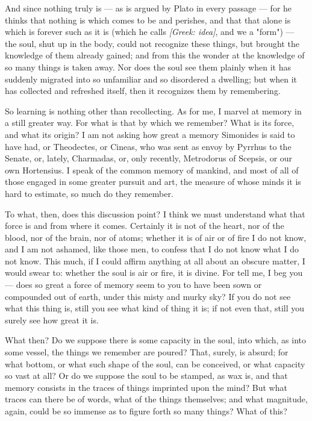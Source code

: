  And since nothing truly is — as is argued by Plato in every passage — for he thinks that nothing is which comes to be and perishes, and that that alone is which is forever such as it is (which he calls \textit{[Greek: idea]}, and we a "form") — the soul, shut up in the body, could not recognize these things, but brought the knowledge of them already gained; and from this the wonder at the knowledge of so many things is taken away. Nor does the soul see them plainly when it has suddenly migrated into so unfamiliar and so disordered a dwelling; but when it has collected and refreshed itself, then it recognizes them by remembering.

 So learning is nothing other than recollecting. As for me, I marvel at memory in a still greater way. For what is that by which we remember? What is its force, and what its origin? I am not asking how great a memory Simonides is said to have had, or Theodectes, or Cineas, who was sent as envoy by Pyrrhus to the Senate, or, lately, Charmadas, or, only recently, Metrodorus of Scepsis, or our own Hortensius. I speak of the common memory of mankind, and most of all of those engaged in some greater pursuit and art, the measure of whose minds it is hard to estimate, so much do they remember.

 To what, then, does this discussion point? I think we must understand what that force is and from where it comes. Certainly it is not of the heart, nor of the blood, nor of the brain, nor of atoms; whether it is of air or of fire I do not know, and I am not ashamed, like those men, to confess that I do not know what I do not know. This much, if I could affirm anything at all about an obscure matter, I would swear to: whether the soul is air or fire, it is divine. For tell me, I beg you — does so great a force of memory seem to you to have been sown or compounded out of earth, under this misty and murky sky? If you do not see what this thing is, still you see what kind of thing it is; if not even that, still you surely see how great it is.

 What then? Do we suppose there is some capacity in the soul, into which, as into some vessel, the things we remember are poured? That, surely, is absurd; for what bottom, or what such shape of the soul, can be conceived, or what capacity so vast at all? Or do we suppose the soul to be stamped, as wax is, and that memory consists in the traces of things imprinted upon the mind? But what traces can there be of words, what of the things themselves; and what magnitude, again, could be so immense as to figure forth so many things? What of this?

